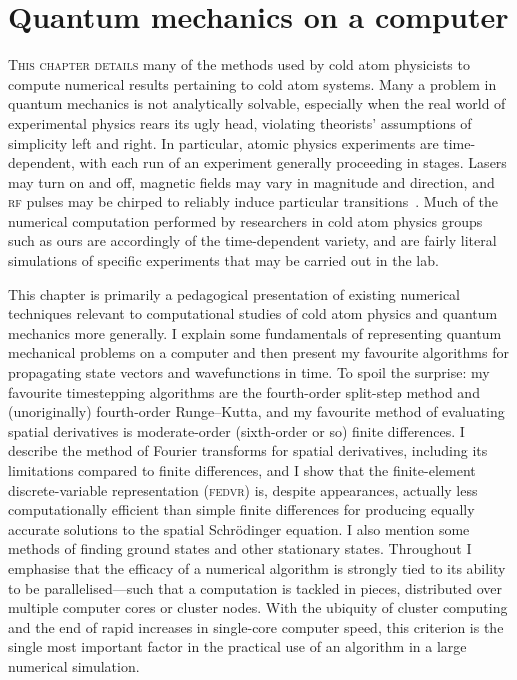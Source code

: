 \chapter{Quantum mechanics on a computer}\label{chap:numerics}

\lettrine[lines=3]{T}{his chapter details} many of the methods used by cold atom physicists to compute numerical results pertaining to cold atom systems. Many a problem in quantum mechanics is not analytically solvable, especially when the real world of experimental physics rears its ugly head, violating theorists' assumptions of simplicity left and right. In particular, atomic physics experiments are time-dependent, with each run of an experiment generally proceeding in stages. Lasers may turn on and off, magnetic fields may vary in magnitude and direction, and \textsc{rf} pulses may be chirped to reliably induce particular transitions~\cite{bennie_precise_2014}. Much of the numerical computation performed by researchers in cold atom physics groups such as ours are accordingly of the time-dependent variety, and are fairly literal simulations of specific experiments that may be carried out in the lab.

This chapter is primarily a pedagogical presentation of existing numerical techniques relevant to computational studies of cold atom physics and quantum mechanics more generally. I explain some fundamentals of representing quantum mechanical problems on a computer and then present my favourite algorithms for propagating state vectors and wavefunctions in time. To spoil the surprise: my favourite timestepping algorithms are the fourth-order split-step method and (unoriginally) fourth-order Runge--Kutta, and my favourite method of evaluating spatial derivatives is moderate-order (sixth-order or so) finite differences. I describe the method of Fourier transforms for spatial derivatives, including its limitations compared to finite differences, and I show that the finite-element discrete-variable representation (\textsc{fedvr}) is, despite appearances, actually less computationally efficient than simple finite differences for producing equally accurate solutions to the spatial Schr\"odinger equation. I also mention some methods of finding ground states and other stationary states. Throughout I emphasise that the efficacy of a numerical algorithm is strongly tied to its ability to be parallelised---such that a computation is tackled in pieces, distributed over multiple computer cores or cluster nodes. With the ubiquity of cluster computing and the end of rapid increases in single-core computer speed, this criterion is the single most important factor in the practical use of an algorithm in a large numerical simulation.

